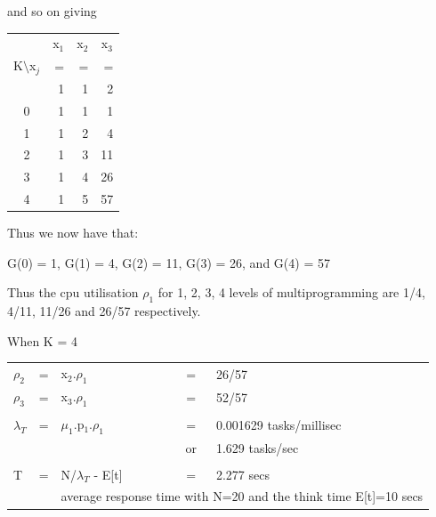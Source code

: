 \documentclass[12pt,fleqn]{report}
\begin{document}
\noindent
and so on giving


\begin{center}
\begin{tabular}{|| c |r  r r|| }
\hline
                  & \multicolumn{1}{c}{x$_1$}
                  & \multicolumn{1}{c}{x$_2$}
                  & \multicolumn{1}{c||}{x$_3$}\\

K$\setminus$x$_j$ & =      & =      & =    \\
                  & 1      & 1      & 2     \\
\hline
0                 & 1      &  1     &  1     \\
1                 & 1      &  2     &  4     \\
2                 & 1      &  3     &  11     \\
3                 & 1      &  4     &  26     \\
4                 & 1      &  5     &  57     \\
\hline
\end{tabular}
\end{center}


Thus we now have that:

\begin{center}
G(0) = 1, G(1) = 4, G(2) = 11, G(3) = 26, and G(4) = 57
\end{center}

Thus the cpu utilisation $\rho_1$ for 1, 2, 3, 4 levels of
multiprogramming are 1/4, 4/11, 11/26 and 26/57 respectively.

When K = 4

\begin{center}
\begin{tabular}{l c l c l}
$\rho_2$ & = &  x$_2$.$\rho_1$ & = & 26/57 \\
$\rho_3$ & = &  x$_3$.$\rho_1$ & = & 52/57 \\
&&&&\\
$\lambda_T$ &= & $\mu_1$.p$_1$.$\rho_1$ & = & 0.001629 tasks/millisec\\
            &&                          & or &  1.629 tasks/sec\\
&&&&\\
T           & = & N/$\lambda_T$ - E[t] & = & 2.277 secs\\
            &   & \multicolumn{3}{r}{average response time with N=20
and the think time E[t]=10 secs}\\
\end{tabular}
\end{center}
\end{document}

